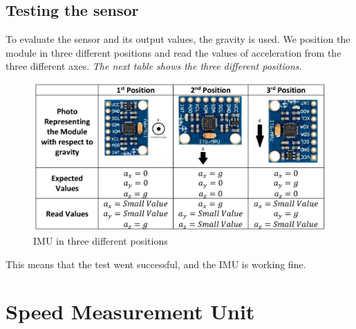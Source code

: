 \subsection{Testing the sensor}
To evaluate the sensor and its output values, the gravity is used.
We position the module in three different positions and read the values of acceleration from the three different axes.
\textit{The next table shows the three different positions.}


\begin{figure}[h]
    \centering
    \includegraphics[scale=.2]{figure/5-6.png}
    \caption{IMU in three different positions}
\end{figure}
This means that the test went successful, and the IMU is working fine.

\section{Speed Measurement Unit}

